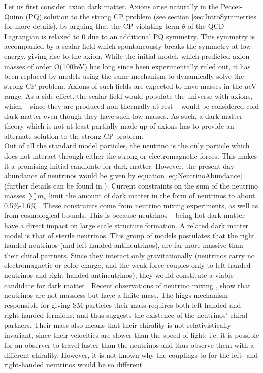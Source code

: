 Let us first consider axion dark matter. Axions arise naturally in the Peccei-Quinn (PQ) solution to the strong CP problem \cite{PQ_axion, Weinberg} (see section \ref{sec:IntroSymmetries} for more details), by arguing that the CP violating term $\bar{\theta}$ of the QCD Lagrangian is relaxed to 0 due to an additional PQ symmetry. This symmetry is accompanied by a scalar field which spontaneously breaks the symmetry at low energy, giving rise to the axion. While the initial model, which predicted axion masses of order O(100keV) has long since been experimentally ruled out, it has been replaced by models using the same mechanism to dynamically solve the strong CP problem. Axions of such fields are expected to have masses in the $\mu$eV range. As a side effect, the scalar field would populate the universe with axions, which -- since they are produced non-thermally at rest \cite{cookbook} -- would be considered cold dark matter even though they have such low masses. As such, a dark matter theory which is not at least partially made up of axions has to provide an alternate solution to the strong CP problem. \\

Out of all the standard model particles, the neutrino is the only particle which does not interact through either the strong or electromagnetic forces. This makes it a promising initial candidate for dark matter. However, the present-day abundance of neutrinos would be given by equation \ref{eq:NeutrinoAbundance} (further details can be found in \cite{BAER20151}). Current constraints on the sum of the neutrino masses $\sum m_\nu$ limit the amount of dark matter in the form of neutrinos to about 0.5\%-1.6\% \cite{PDG2022}. These constraints come from neutrino mixing experiments, as well as from cosmological bounds. This is because neutrinos -- being hot dark matter -- have a direct impact on large scale structure formation. A related dark matter model is that of sterile neutrinos. This group of models postulates that the right handed neutrinos (and left-handed antineutrinos), are far more massive than their chiral partners. Since they interact only gravitationally (neutrinos carry no electromagnetic or color charge, and the weak force couples only to left-handed neutrinos and right-handed antineutrinos), they would constitute a viable candidate for dark matter \cite{sterile_neutrino_review}. Recent observations of neutrino mixing \cite{PDG2022}, show that neutrinos are not massless but have a finite mass. The higgs mechanism responsible for giving SM particles their mass requires both left-handed and right-handed fermions, and thus suggests the existence of the neutrinos' chiral partners. Their mass also means that their chirality is not relativistically invariant, since their velocities are slower than the speed of light; i.e. it is possible for an observer to travel faster than the neutrinos and thus observe them with a different chirality. However, it is not known why the couplings to for the left- and right-handed neutrinos would be so different

